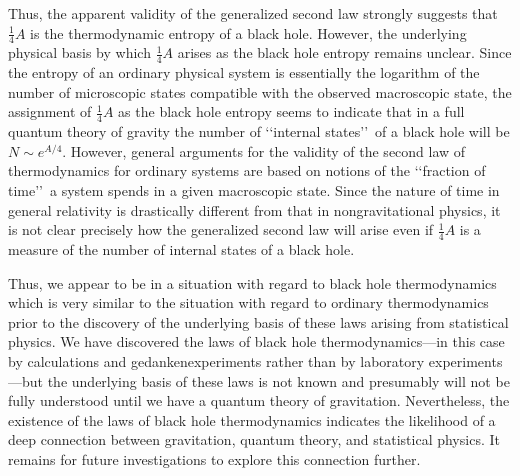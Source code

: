 Thus, the apparent validity of the generalized second law strongly suggests that
\(\frac14A\) is the thermodynamic entropy of a black hole. However, the underlying
physical basis by which \(\frac14A\) arises as the black hole entropy remains
unclear. Since the entropy of an ordinary physical system is essentially the logarithm
of the number of microscopic states compatible with the observed macroscopic state,
the assignment of \(\frac14A\) as the black hole entropy seems to indicate that in a
full quantum theory of gravity the number of \lq\lq internal states\rq\rq\ of a black
hole will be \(N\sim e^{A/4}\). However, general arguments for the validity of the
second law of thermodynamics for ordinary systems are based on notions of the
\lq\lq fraction of time\rq\rq\ a system spends in a given macroscopic state. Since
the nature of time in general relativity is drastically different from that in
nongravitational physics, it is not clear precisely how the generalized second law
will arise even if \(\frac14A\) is a measure of the number of internal states of a
black hole.

Thus, we appear to be in a situation with regard to black hole thermodynamics which
is very similar to the situation with regard to ordinary thermodynamics prior to the
discovery of the underlying basis of these laws arising from statistical physics. We
have discovered the laws of black hole thermodynamics---in this case by calculations
and gedankenexperiments rather than by laboratory experiments---but the underlying
basis of these laws is not known and presumably will not be fully understood until we
have a quantum theory of gravitation. Nevertheless, the existence of the laws of black
hole thermodynamics indicates the likelihood of a deep connection between gravitation,
quantum theory, and statistical physics. It remains for future investigations to explore
this connection further.
